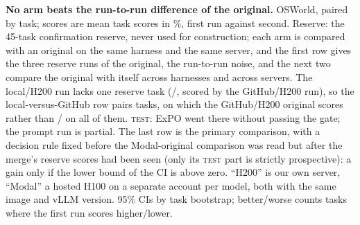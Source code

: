 \begin{table}[t]
\centering\small
\resizebox{\linewidth}{!}{}
\caption{\textbf{No arm beats the run-to-run difference of the original.} OSWorld, paired by task; scores are mean task scores in \%, first run against second. Reserve: the 45-task confirmation reserve, never used for construction; each arm is compared with an original on the same harness and the same server, and the first row gives the three reserve runs of the original, the run-to-run noise, and the next two compare the original with itself across harnesses and across servers. The local/H200 run lacks one reserve task (\texttt{\onNoiseMissingDomain}/\texttt{\onNoiseMissingTask}, scored \onNoiseMissingScore{} by the GitHub/H200 run), so the local-versus-GitHub row pairs \onNoiseN{} tasks, on which the GitHub/H200 original scores \onNoiseOrig{} rather than \onReserveGhOrigScore/\onReserveGhOrigN{} on all of them. \textsc{test}: ExPO went there without passing the gate; the prompt run is partial. The last row is the primary comparison, with a decision rule fixed before the Modal-original comparison was read but after the merge's reserve scores had been seen (only its \textsc{test} part is strictly prospective): a gain only if the lower bound of the CI is above zero. ``H200'' is our own server, ``Modal'' a hosted H100 on a separate account per model, both with the same image and vLLM version. 95\% CIs by task bootstrap; better/worse counts tasks where the first run scores higher/lower.}
\label{tab:b4-heldout}
\end{table}
